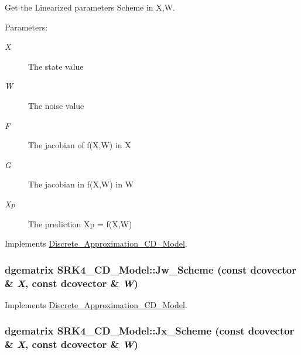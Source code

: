Get the Linearized parameters Scheme in X,W. 

\begin{Desc}
\item[Parameters:]
\begin{description}
\item[{\em X}]The state value \item[{\em W}]The noise value \item[{\em F}]The jacobian of f(X,W) in X \item[{\em G}]The jacobian in f(X,W) in W \item[{\em Xp}]The prediction Xp = f(X,W) \end{description}
\end{Desc}


Implements \hyperlink{class_discrete___approximation___c_d___model_0a486fada10e6f5569d186edc7b32110}{Discrete\_\-Approximation\_\-CD\_\-Model}.\hypertarget{class_s_r_k4___c_d___model_37045148c197b6143df008855179dfa3}{
\subsubsection[{Jw\_\-Scheme}]{\setlength{\rightskip}{0pt plus 5cm}dgematrix SRK4\_\-CD\_\-Model::Jw\_\-Scheme (const dcovector \& {\em X}, \/  const dcovector \& {\em W})}}
\label{class_s_r_k4___c_d___model_37045148c197b6143df008855179dfa3}




Implements \hyperlink{class_discrete___approximation___c_d___model_c7496999409a3f05125ceb7fe85e85ab}{Discrete\_\-Approximation\_\-CD\_\-Model}.\hypertarget{class_s_r_k4___c_d___model_2e0543a20a7ba52958606bda265413bd}{
\subsubsection[{Jx\_\-Scheme}]{\setlength{\rightskip}{0pt plus 5cm}dgematrix SRK4\_\-CD\_\-Model::Jx\_\-Scheme (const dcovector \& {\em X}, \/  const dcovector \& {\em W})}}
\label{class_s_r_k4___c_d___model_2e0543a20a7ba52958606bda265413bd}




